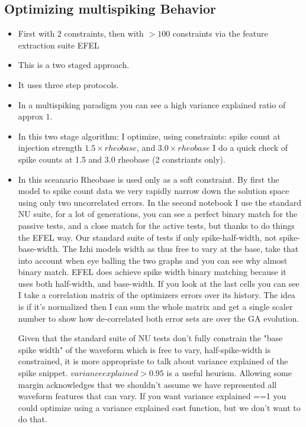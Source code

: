 \documentclass{article}
\begin{document}
\subsection{Optimizing multispiking Behavior}
\begin{itemize}
\item First with $2$ constraints, then with $>100$ constraints via the feature extraction suite EFEL

\item This is a two staged approach. 
\item It uses three step protocols.

\item In a multispiking paradigm you can see a high variance explained ratio of approx $1$.  

\item In this two stage algorithm: I optimize, using constraints: spike count at injection strength $1.5 \times rheobase $, and $3.0 \times rheobase $
I do a quick check of spike counts at 1.5 and 3.0 rheobase (2 constriants only).

\item In this sceanario Rheobase is used only as a soft constraint.  By first the model to spike count data we very rapidly narrow down the solution space using only two uncorrelated errors. In the second notebook I use the standard NU suite, for a lot of generations, you can see a perfect binary match for the passive tests, and a close match for the active tests, but thanks to do things the EFEL way. Our standard suite of tests if only spike-half-width, not spike-base-width. The Izhi models width as thus free to vary at the base, take that into account when eye balling the two graphs and you can see why almost binary match. EFEL does achieve spike width binary matching because it uses both half-width, and base-width. If you look at the last cells you can see I take a correlation matrix of the optimizers errors over its history. The idea is if it's normalized then I can sum the whole matrix and get a single scaler number to show how de-correlated both error sets are over the GA evolution. 

Given that the standard suite of NU tests don't fully constrain the "base spike width" of the waveform which is free to vary, half-spike-width is constrained, it is more appropriate to talk about variance explained of the spike snippet. $variance explained>0.95$ is a useful heurism. Allowing some margin acknowledges that we shouldn't assume we have represented all waveform features that can vary. If you want variance explained ==1   you could optimize using a variance explained cost function, but we don't want to do that. 
\end{itemize}







\end{document}
